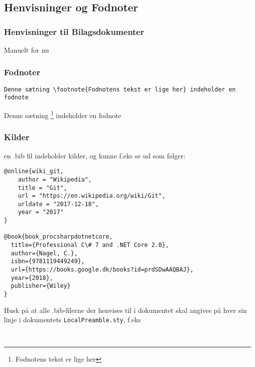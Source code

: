 
\subsection{Henvisninger og Fodnoter}

\subsubsection{Henvisninger til Bilagsdokumenter}

Manuelt for nu

\subsubsection{Fodnoter}
\begin{verbatim}
Denne sætning \footnote{Fodnotens tekst er lige her} indeholder en fodnote
\end{verbatim}

Denne sætning \footnote{Fodnotens tekst er lige her} indeholder en fodnote

\subsubsection{Kilder}

en .bib fil indeholder kilder, og kunne f.eks se ud som følger:

\begin{verbatim}
@online{wiki_git,
    author = "Wikipedia",
    title = "Git",
    url = "https://en.wikipedia.org/wiki/Git",
	urldate = "2017-12-18",
	year = "2017"
}

@book{book_procsharpdotnetcore,
  title={Professional C\# 7 and .NET Core 2.0},
  author={Nagel, C.},
  isbn={9781119449249},
  url={https://books.google.dk/books?id=prdSDwAAQBAJ},
  year={2018},
  publisher={Wiley}
}
\end{verbatim}

Husk på at alle .bib-filerne der henvises til i dokumentet skal angives på hver sin linje i dokumentets \texttt{LocalPreamble.sty}, f.eks

\begin{verbatim}


\end{verbatim}

